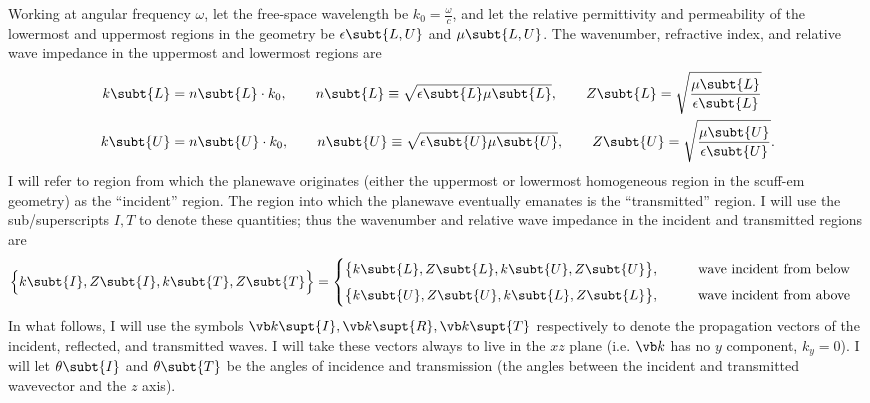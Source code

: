 \documentclass[letterpaper]{article}
\begin{document}
Working at angular frequency $\omega$, let the free-space
wavelength be $k_0=\frac{\omega}{c}$, and let the relative 
permittivity and permeability of the lowermost and uppermost 
regions in the geometry be $\epsilon\subt{L,U}$ and $\mu\subt{L,U}$.
The wavenumber, refractive index, and relative wave impedance in the 
uppermost and lowermost regions are
\begin{align*}
  k\subt{L}&=n\subt{L} \cdot k_0,
   \qquad n\subt{L}\equiv \sqrt{\epsilon\subt{L} \mu\subt{L}},
   \qquad   
  Z\subt{L}=\sqrt\frac{\mu\subt{L}}{\epsilon\subt{L}}
\\
  k\subt{U}&=n\subt{U} \cdot k_0,
   \qquad n\subt{U}\equiv \sqrt{\epsilon\subt{U} \mu\subt{U}},
   \qquad   
  Z\subt{U}=\sqrt\frac{\mu\subt{U}}{\epsilon\subt{U}}.
\end{align*}
I will refer to region from which the planewave 
originates (either the uppermost or lowermost homogeneous
region in the {\sc scuff-em} geometry) as the ``incident'' region.
The region into which the planewave eventually emanates
is the ``transmitted'' region.
I will use the sub/superscripts $I,T$ to denote these quantities;
thus the wavenumber and relative wave impedance in the incident and
transmitted regions are
\begin{align*}
  \Big\{k\subt{I}, Z\subt{I}, k\subt{T}, Z\subt{T}\Big\} 
 &=\begin{cases}
     \big\{k\subt{L}, Z\subt{L}, k\subt{U}, Z\subt{U}\big\},
      \qquad &\text{wave incident from below}
      \\[5pt]
     \big\{k\subt{U}, Z\subt{U}, k\subt{L}, Z\subt{L}\big\},
      \qquad &\text{wave incident from above}
   \end{cases}
\end{align*}
In what follows, I will use the symbols
$\vb k\supt{I}, \vb k\supt{R}, \vb k\supt{T}$ respectively to denote the
propagation vectors of the incident, reflected, and transmitted waves.
I will take these vectors always to live in the $xz$ plane (i.e. $\vb k$
has no $y$ component, $k_y=0$). I will let 
$\theta\subt{I}$ and $\theta\subt{T}$
be the angles of incidence and transmission
(the angles between the incident and transmitted wavevector and the $z$ axis).
\end{document}
